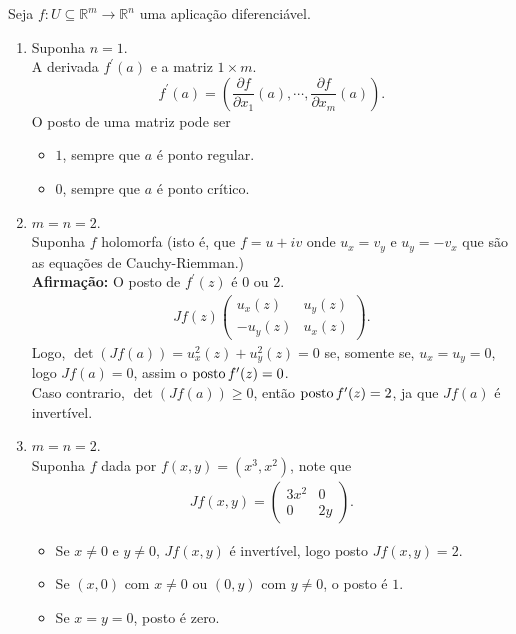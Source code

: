 \begin{example}
  Seja $f:U\subseteq\mathbb{R}^{m}\to\mathbb{R}^{n}$ uma aplicação diferenciável.
  \begin{enumerate}
    \item Suponha $n=1$.\\
      A derivada $f^{\prime}(a)$ e a matriz $1\times m$.\\
      $$f^{\prime}(a)=\left( \frac{\partial f}{\partial x_1}(a),\cdots,\frac{\partial f}{\partial x_m}(a) \right).$$
      O posto de uma matriz pode ser
      \begin{itemize}
        \item $1$, sempre que $a$ é ponto regular.
        \item $0$, sempre que $a$ é ponto crítico. 
      \end{itemize}
    \item $m=n=2$.\\
      Suponha $f$ holomorfa (isto é, que $f=u+iv$ onde $u_{x}=v_{y}$ e $u_{y}=-v_{x}$ que são as equações de Cauchy-Riemman.)\\
      \textbf{Afirmação:} O posto de $f^{\prime}(z)$ é $0$ ou $2$.
      \begin{align*}
        Jf(z)\begin{pmatrix}
          u_{x}(z) & u_{y}(z) \\
          -u_{y}(z) & u_{x}(z)
        \end{pmatrix}.
      \end{align*}
      Logo, $\det(Jf(a))=u_{x}^{2}(z)+u_{y}^{2}(z)=0$ se, somente se, $u_{x}=u_{y}=0$, logo $Jf(a)=0$, assim o $\operatorname{posto} f^{\prime}(z)=0$.\\
      Caso contrario, $\det(Jf(a))\geq 0$, então $\operatorname{posto} f^{\prime}
      (z)=2$, ja que $Jf(a)$ é invertível.
    \item $m=n=2$.\\
      Suponha $f$ dada por $f(x,y)=(x^{3},x^{2})$, note que
      \begin{align*}
        Jf(x,y)=\begin{pmatrix}
          3x^{2} & 0 \\
          0 & 2y
        \end{pmatrix}.
      \end{align*}
      \begin{itemize}
        \item Se $x\neq 0$ e $y\neq 0$, $Jf(x,y)$ é invertível, logo posto $Jf(x,y)=2$.
        \item Se $(x,0)$ com $x\neq 0$ ou $(0,y)$ com $y\neq 0$, o posto é $1$.
        \item Se $x=y=0$, posto é zero.
      \end{itemize}
  \end{enumerate}
\end{example}

